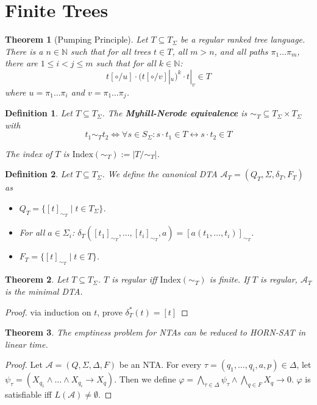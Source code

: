 \documentclass{article}
\newtheorem{theorem}{Theorem}[section]
\newtheorem{definition}{Definition}
\begin{document}
\newpage 
\section{Finite Trees}
\begin{theorem}[Pumping Principle]
	Let $T \subseteq T_\Sigma$ be a regular ranked tree language. There is a $n \in \mathbb{N}$ such that for all trees $t \in T$, all $m > n$, and all paths $\pi_1 \dots \pi_m$, there are $1 \leq i < j \leq m$ such that for all $k \in \mathbb{N}$:
	$$t[\circ / u] \cdot (t[\circ/v]|_u)^k \cdot t|_v \in T$$
	where $u = \pi_1 \dots \pi_i$ and $v = \pi_1 \dots \pi_j$.
\end{theorem}

\begin{definition}
	Let $T \subseteq T_\Sigma$. The \textbf{Myhill-Nerode equivalence} is $\sim_T \subseteq T_\Sigma \times T_\Sigma$ with 
	$$t_1 \sim_T t_2 \Leftrightarrow \forall s \in S_\Sigma: s \cdot t_1 \in T \leftrightarrow s \cdot t_2 \in T$$
	
	The index of $T$ is $\text{Index}(\sim_T) := |T/\sim_T|$.
\end{definition}

\begin{definition}
	Let $T \subseteq T_\Sigma$. We define the canonical DTA $\mathcal{A}_T = (Q_T, \Sigma, \delta_T, F_T)$ as
	\begin{itemize}
		\item $Q_T = \{ [t]_{\sim_T} \mid t \in T_\Sigma \}$.
		\item For all $a \in \Sigma_i$: $\delta_T([t_1]_{\sim_T}, \dots, [t_i]_{\sim_T}, a) = [a(t_1, \dots, t_i)]_{\sim_T}$.
		\item $F_T = \{ [t]_{\sim_T} \mid t \in T \}$.
	\end{itemize}
\end{definition}

\begin{theorem}
	Let $T \subseteq T_\Sigma$. $T$ is regular iff $\text{Index}(\sim_T)$ is finite. If $T$ is regular, $\mathcal{A}_T$ is the minimal DTA.
\end{theorem}
\begin{proof}
	via induction on $t$, prove $\delta_T^*(t) = [t]$
\end{proof}

\begin{theorem}
	The emptiness problem for NTAs can be reduced to \textsf{HORN-SAT} in linear time.
\end{theorem}
\begin{proof}
	Let $\mathcal{A} = (Q, \Sigma, \Delta, F)$ be an NTA. For every $\tau = (q_1, \dots, q_i, a, p) \in \Delta$, let \linebreak $\psi_\tau = (X_{q_1} \land \dots \land X_{q_i} \rightarrow X_q)$. Then we define $\varphi = \bigwedge\limits_{\tau \in \Delta} \psi_\tau \land \bigwedge\limits_{q \in F} X_q \rightarrow 0$. $\varphi$ is satisfiable iff $L(\mathcal{A}) \neq \emptyset$.
\end{proof}
\end{document}
